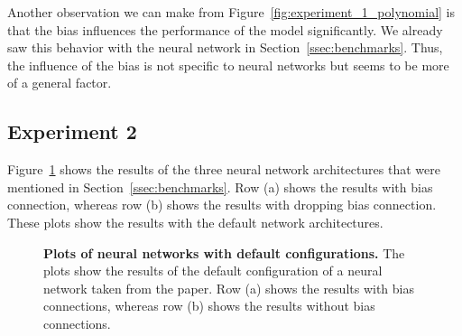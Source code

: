 Another observation we can make from Figure~\ref{fig:experiment_1_polynomial} is that the bias influences the performance of the model significantly. We already saw this behavior with the neural network in Section~\ref{ssec:benchmarks}. Thus, the influence of the bias is not specific to neural networks but seems to be more of a general factor.


\subsection{Experiment 2}
Figure~\ref{fig:experiment_2_default} shows the results of the three neural network architectures that were mentioned in Section~\ref{ssec:benchmarks}. Row (a) shows the results with bias connection, whereas row (b) shows the results with dropping bias connection. These plots show the results with the default network architectures.

\begin{figure}[!ht]
\begin{figrow}
\item \label{row:NN_with_bias_default} 
\item \label{row:NN_without_default}  
\end{figrow}
\caption[Plots of neural networks with default configurations]{
  \textbf{Plots of neural networks with default configurations.}
   The plots show the results of the default configuration of a neural network taken from the paper. Row (a) shows the results with bias connections, whereas row (b) shows the results without bias connections.
}
\label{fig:experiment_2_default}
\end{figure}

